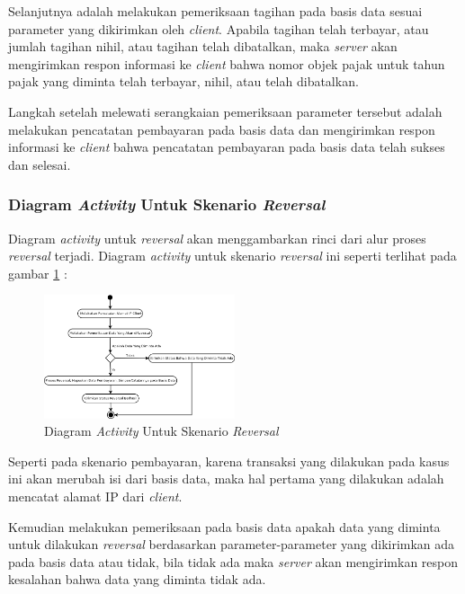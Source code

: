 \documentclass[pdftex,12pt, oneside]{article}
\begin{document}
Selanjutnya adalah melakukan pemeriksaan tagihan pada basis data sesuai parameter yang dikirimkan oleh \textit{client}. Apabila tagihan telah terbayar, atau jumlah tagihan nihil, atau tagihan telah dibatalkan, maka \textit{server} akan mengirimkan respon informasi ke \textit{client} bahwa nomor objek pajak untuk tahun pajak yang diminta telah terbayar, nihil, atau telah dibatalkan.

Langkah setelah melewati serangkaian pemeriksaan parameter tersebut adalah melakukan pencatatan pembayaran pada basis data dan mengirimkan respon informasi ke \textit{client} bahwa pencatatan pembayaran pada basis data telah sukses dan selesai.

\subsubsection{Diagram \textit{Activity} Untuk Skenario \textit{Reversal}}

Diagram \textit{activity} untuk \textit{reversal} akan menggambarkan rinci dari alur proses \textit{reversal} terjadi. Diagram \textit{activity} untuk skenario \textit{reversal} ini seperti terlihat pada gambar \ref{fig:uml-act-reversal} :

\begin{figure}[H]
  \centering
  \includegraphics[width=0.5\textwidth]{./resources/uml/uml-act-reversal}
  \caption{Diagram \textit{Activity} Untuk Skenario \textit{Reversal}}
  \label{fig:uml-act-reversal}
\end{figure}

Seperti pada skenario pembayaran, karena transaksi yang dilakukan pada kasus ini akan merubah isi dari basis data, maka hal pertama yang dilakukan adalah mencatat alamat IP dari \textit{client}.

Kemudian melakukan pemeriksaan pada basis data apakah data yang diminta untuk dilakukan \textit{reversal} berdasarkan parameter-parameter yang dikirimkan ada pada basis data atau tidak, bila tidak ada maka \textit{server} akan mengirimkan respon kesalahan bahwa data yang diminta tidak ada.
\end{document}
